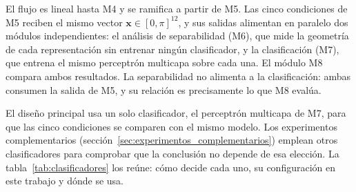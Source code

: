 El flujo es lineal hasta M4 y se ramifica a partir de M5. Las cinco condiciones de M5 reciben el
mismo vector $\mathbf{x}\in[0,\pi]^{12}$, y sus salidas alimentan en paralelo dos módulos
independientes: el análisis de separabilidad (M6), que mide la geometría de cada representación
sin entrenar ningún clasificador, y la clasificación (M7), que entrena el mismo perceptrón
multicapa sobre cada una. El módulo M8 compara ambos resultados. La separabilidad no alimenta a la
clasificación: ambas consumen la salida de M5, y su relación es precisamente lo que M8 evalúa.

El diseño principal usa un solo clasificador, el perceptrón multicapa de M7, para que las cinco
condiciones se comparen con el mismo modelo. Los experimentos complementarios
(sección~\ref{sec:experimentos_complementarios}) emplean otros clasificadores para comprobar que la
conclusión no depende de esa elección. La tabla~\ref{tab:clasificadores} los reúne: cómo decide cada uno,
su configuración en este trabajo y dónde se usa.

